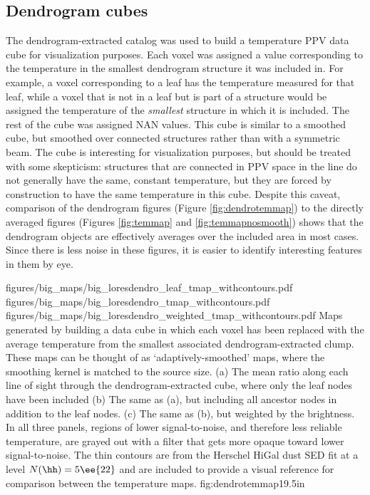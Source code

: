 \subsection{Dendrogram cubes}

The dendrogram-extracted catalog was used to build a temperature PPV data cube
for visualization purposes.  Each voxel was assigned a value corresponding to
the temperature in the smallest dendrogram structure it was included in.  For
example, a voxel corresponding to a leaf has the temperature measured for that
leaf, while a voxel that is not in a leaf but is part of a structure would be
assigned the temperature of the \emph{smallest} structure in which it is
included.  The rest of the
cube was assigned NAN values.  This cube is similar to a smoothed cube, but
smoothed over connected structures rather than with a symmetric beam.  The cube
is interesting for visualization purposes, but should be treated with some
skepticism: structures that are connected in PPV space in the \threeohthree
line do not generally have the same, constant temperature, but they are forced
by construction to have the same temperature in this cube.  Despite this
caveat, comparison of the dendrogram figures (Figure \ref{fig:dendrotemmap}) to
the directly averaged figures (Figures \ref{fig:temmap} and
\ref{fig:temmapnosmooth}) shows that the dendrogram objects are effectively
averages over the included area in most cases.  Since there is less noise in
these figures, it is easier to identify interesting features in them by eye.




\RotFigureThreeAA
{figures/big_maps/big_loresdendro_leaf_tmap_withcontours.pdf}
{figures/big_maps/big_loresdendro_tmap_withcontours.pdf}
{figures/big_maps/big_loresdendro_weighted_tmap_withcontours.pdf}
{Maps generated by building a data cube in which each voxel has been replaced
with the average temperature from the smallest associated dendrogram-extracted
clump.  These maps can be thought of as `adaptively-smoothed' maps, where the
smoothing kernel is matched to the source size.
(a) The mean ratio along each line of sight through the dendrogram-extracted
cube, where only the leaf nodes have been included
\newline
(b) The same as (a), but including all ancestor nodes in addition to the leaf
nodes. 
\newline
(c) The same as (b), but weighted by the \threeohthree brightness.
\newline
In all three panels, regions of lower signal-to-noise, and therefore less
reliable
temperature, are grayed out with a filter that gets more opaque toward lower
signal-to-noise.  The thin contours are from the Herschel HiGal
dust SED fit at a level $N(\hh)=5\ee{22}$ \percc and are included to provide a
visual reference for comparison between the temperature maps.
}
{fig:dendrotemmap}{1}{9.5in}

